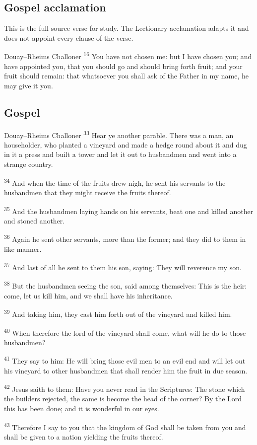 \subsection{Gospel acclamation}
\label{proper-acclamation}
This is the full source verse for study. The Lectionary acclamation adapts it and does not appoint every clause of the verse.
\begin{englishwitness}{Douay--Rheims Challoner}
\textsuperscript{16} You have not chosen me: but I have chosen you; and have appointed you, that you should go and should bring forth fruit; and your fruit should remain: that whatsoever you shall ask of the Father in my name, he may give it you.
\end{englishwitness}

\subsection{Gospel}
\label{proper-gospel}

\begin{englishwitness}{Douay--Rheims Challoner}
\textsuperscript{33} Hear ye another parable. There was a man, an householder, who planted a vineyard and made a hedge round about it and dug in it a press and built a tower and let it out to husbandmen and went into a strange country.

\textsuperscript{34} And when the time of the fruits drew nigh, he sent his servants to the husbandmen that they might receive the fruits thereof.

\textsuperscript{35} And the husbandmen laying hands on his servants, beat one and killed another and stoned another.

\textsuperscript{36} Again he sent other servants, more than the former; and they did to them in like manner.

\textsuperscript{37} And last of all he sent to them his son, saying: They will reverence my son.

\textsuperscript{38} But the husbandmen seeing the son, said among themselves: This is the heir: come, let us kill him, and we shall have his inheritance.

\textsuperscript{39} And taking him, they cast him forth out of the vineyard and killed him.

\textsuperscript{40} When therefore the lord of the vineyard shall come, what will he do to those husbandmen?

\textsuperscript{41} They say to him: He will bring those evil men to an evil end and will let out his vineyard to other husbandmen that shall render him the fruit in due season.

\textsuperscript{42} Jesus saith to them: Have you never read in the Scriptures: The stone which the builders rejected, the same is become the head of the corner? By the Lord this has been done; and it is wonderful in our eyes.

\textsuperscript{43} Therefore I say to you that the kingdom of God shall be taken from you and shall be given to a nation yielding the fruits thereof.
\end{englishwitness}

